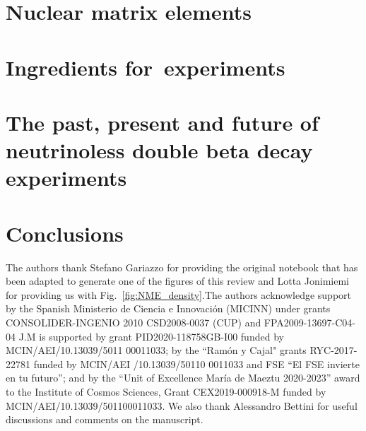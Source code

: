 \documentclass[sn-mathphys]{sn-jnl}%
\begin{document}
\section{Nuclear matrix elements} \label{sec:nme}


\section{Ingredients for\bbonu\ experiments} \label{sec:ingredients}


\section{The past, present and future of neutrinoless double beta decay experiments} \label{sec:experiments}


\section{Conclusions}



\backmatter

The authors thank Stefano Gariazzo for providing the original notebook that has been adapted to generate one of the figures of this review and Lotta Jonimiemi for providing us with Fig.~\ref{fig:NME_density}.The authors acknowledge support by the Spanish Ministerio de Ciencia e Innovaci\'on (MICINN) under grants CONSOLIDER-INGENIO 2010 CSD2008-0037 (CUP) and FPA2009-13697-C04-04
J.M is supported by grant PID2020-118758GB-I00 
funded by MCIN/AEI/10.13039/5011 00011033; 
by the ``Ram\'on y Cajal" grants RYC-2017-22781 funded by MCIN/AEI /10.13039/50110 0011033 and FSE “El FSE invierte en tu futuro”;  
and by the  “Unit of Excellence Mar\'ia de Maeztu 2020-2023” award to the Institute of Cosmos Sciences, Grant CEX2019-000918-M funded by MCIN/AEI/10.13039/501100011033.
We also thank Alessandro Bettini 
for useful discussions and comments on the manuscript.



\end{document}
